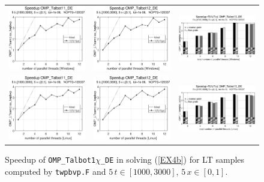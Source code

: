 \documentclass[a4paper,10pt]{report}%
\begin{document}
\begin{figure}[htb]
\centering
\begin{tabular}{ccc} %
\includegraphics[height=0.2\textwidth]{./FIGS/EX4b/EX4b_twpbvp_speedup_11_5t_1000_Windows.eps} &
\includegraphics[height=0.2\textwidth]{./FIGS/EX4b/EX4b_twpbvp_speedup_12_5t_1000_Windows.eps} &
\includegraphics[height=0.2\textwidth,keepaspectratio=true]{./FIGS/EX4b/EX4b_twpbvp_speedup_13_5t_1000_Windows.eps} \\
\includegraphics[height=0.2\textwidth]{./FIGS/EX4b/EX4b_twpbvp_speedup_11_5t_1000_Linux.eps} &
\includegraphics[height=0.2\textwidth]{./FIGS/EX4b/EX4b_twpbvp_speedup_12_5t_1000_Linux.eps} &
\includegraphics[height=0.2\textwidth,keepaspectratio=true]{./FIGS/EX4b/EX4b_twpbvp_speedup_13_5t_1000_Linux.eps}
\end{tabular}
\caption{\small Speedup of {\tt OMP\_Talbot1$\chi$\_DE} in solving (\ref{EX4b}) for LT samples computed
by {\tt twpbvp.F} and $5\,t\in[1000,3000]$, $5\,x\in[0,1]$.}
\label{PAR_EX4b_speedup_twpbvp3}
\end{figure}
\end{document}
